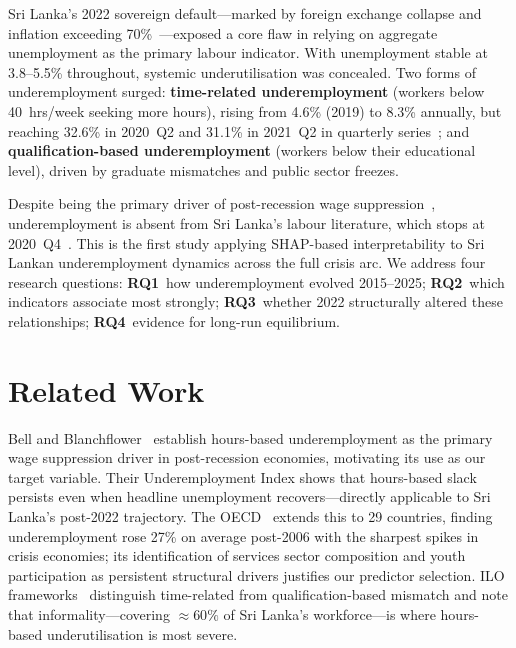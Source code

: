 \documentclass[sigconf]{acmart}
\begin{document}
Sri Lanka's 2022 sovereign default---marked by foreign exchange collapse and inflation exceeding 70\%~\cite{cbsl2025}---exposed a core flaw in relying on aggregate unemployment as the primary labour indicator. With unemployment stable at 3.8--5.5\% throughout, systemic underutilisation was concealed. Two forms of underemployment surged: \textbf{time-related underemployment} (workers below 40~hrs/week seeking more hours), rising from 4.6\% (2019) to 8.3\% annually, but reaching 32.6\% in 2020~Q2 and 31.1\% in 2021~Q2 in quarterly series~\cite{dcs2025}; and \textbf{qualification-based underemployment} (workers below their educational level), driven by graduate mismatches and public sector freezes.

Despite being the primary driver of post-recession wage suppression~\cite{bell2018underemployment}, underemployment is absent from Sri Lanka's labour literature, which stops at 2020~Q4~\cite{pabasara2025impact}. This is the first study applying SHAP-based interpretability to Sri Lankan underemployment dynamics across the full crisis arc. We address four research questions: \textbf{RQ1}~how underemployment evolved 2015--2025; \textbf{RQ2}~which indicators associate most strongly; \textbf{RQ3}~whether 2022 structurally altered these relationships; \textbf{RQ4}~evidence for long-run equilibrium.

\section{Related Work}

Bell and Blanchflower~\cite{bell2018underemployment} establish hours-based underemployment as the primary wage suppression driver in post-recession economies, motivating its use as our target variable. Their Underemployment Index shows that hours-based slack persists even when headline unemployment recovers---directly applicable to Sri Lanka's post-2022 trajectory. The OECD~\cite{oecd2017} extends this to 29 countries, finding underemployment rose 27\% on average post-2006 with the sharpest spikes in crisis economies; its identification of services sector composition and youth participation as persistent structural drivers justifies our predictor selection. ILO frameworks~\cite{ilo2013,iloweso2024} distinguish time-related from qualification-based mismatch and note that informality---covering ${\approx}60\%$ of Sri Lanka's workforce---is where hours-based underutilisation is most severe.
\end{document}
